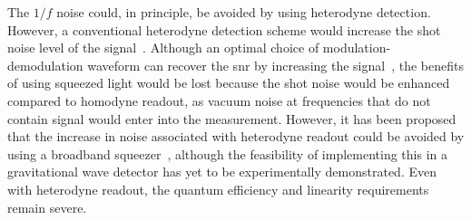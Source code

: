 \par
The $1/f$ noise could, in principle, be avoided by using heterodyne detection. However, a conventional heterodyne detection scheme would increase the shot noise level of the signal~\cite{Schnupp_shot_noise,Meers1991,Niebauer1991}. Although an optimal choice of modulation-demodulation waveform can recover the \gls{snr} by increasing the signal~\cite{Meers1991}, the benefits of using squeezed light would be lost because the shot noise would be enhanced compared to homodyne readout, as vacuum noise at frequencies that do not contain signal would enter into the measurement. However, it has been proposed that the increase in noise associated with heterodyne readout could be avoided by using a broadband squeezer~\cite{Zhang2020a}, although the feasibility of implementing this in a gravitational wave detector has yet to be experimentally demonstrated. Even with heterodyne readout, the quantum efficiency and linearity requirements remain severe. 
